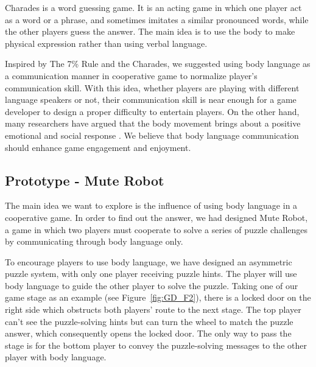 Charades\cite{GD3} is a word guessing game. It is an acting game in which one player act as a word or a phrase, and sometimes imitates a similar pronounced words, while the other players guess the answer. The main idea is to use the body to make physical expression rather than using verbal language. 


Inspired by The 7\% Rule and the Charades, we suggested using body language as a communication manner in cooperative game to normalize player's communication skill. With this idea, whether players are playing with different language speakers or not, their communication skill is near enough for a game developer to design a proper difficulty to entertain players. On the other hand, many researchers have argued that the body movement brings about a positive emotional and social response \cite{GD7, GD8, GD9}. We believe that body language communication should enhance game engagement and enjoyment.


\subsection{Prototype - Mute Robot}


The main idea we want to explore is the influence of using body language in a cooperative game. In order to find out the answer, we had designed Mute Robot, a game in which two players must cooperate to solve a series of puzzle challenges by communicating through body language only.

To encourage players to use body language, we have designed an asymmetric puzzle system, with only one player receiving puzzle hints. The player will use body language to guide the other player to solve the puzzle. Taking one of our game stage as an example (see Figure~\ref{fig:GD_F2}), there is a locked door on the right side which obstructs both players' route to the next stage. The top player can't see the puzzle-solving hints but can turn the wheel to match the puzzle answer, which consequently opens the locked door. The only way to pass the stage is for the bottom player to convey the puzzle-solving messages to the other player with body language.


